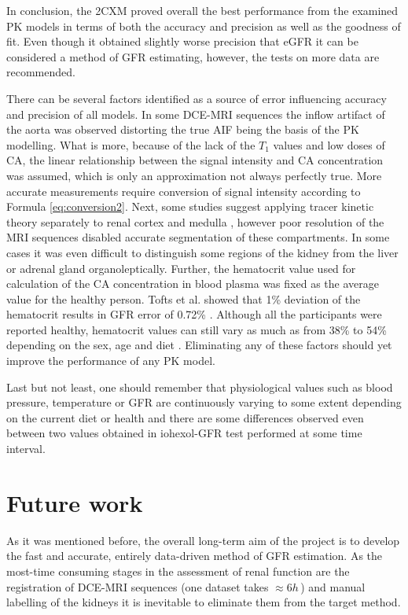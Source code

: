 In conclusion, the 2CXM proved overall the best performance from the examined PK models in terms of both the accuracy and precision as well as the goodness of fit. Even though it obtained slightly worse precision that eGFR it can be considered a method of GFR estimating, however, the tests on more data are recommended.      





There can be several factors identified as a source of error influencing accuracy and precision of all models. In some DCE-MRI sequences the inflow artifact of the aorta was observed distorting the true AIF being the basis of the PK modelling.   
What is more, because of the lack of the $T_1$ values and low doses of CA, the linear relationship between the signal intensity and CA concentration was assumed, which is only an approximation not always perfectly true. More accurate measurements require conversion of signal intensity according to Formula \ref{eq:conversion2}.  
Next, some studies suggest applying tracer kinetic theory separately to renal cortex and medulla \cite{baumann2000quantitative, lee2007renal}, however poor resolution of the MRI sequences disabled accurate segmentation of these compartments. In some cases it was even difficult to distinguish some regions of the kidney from the liver or adrenal gland organoleptically.   
Further, the hematocrit value used for calculation of the CA concentration in blood plasma was fixed as the average value for the  healthy person. Tofts et al. showed that  1\% deviation of the hematocrit results in GFR error of 0.72\% \cite{tofts2012precise}. Although all the participants were reported healthy, hematocrit values can still vary as much as from 38\% to 54\% depending on the sex, age and diet \cite{hct}. Eliminating any of these factors should yet improve the performance of any PK model.   

Last but not least, one should remember that physiological values such as blood pressure, temperature or GFR are continuously varying to some extent depending on the current diet or health and there are some differences observed even between two values obtained in iohexol-GFR test performed at some time interval.

\section{Future work}
As it was mentioned before, the overall long-term aim of the project is to develop the fast and accurate, entirely data-driven method of GFR estimation. As the most-time consuming stages in the assessment of renal function are the registration of DCE-MRI sequences (one dataset takes $\approx 6h\,$) and manual labelling of the kidneys it is inevitable to eliminate them from the target method.   


